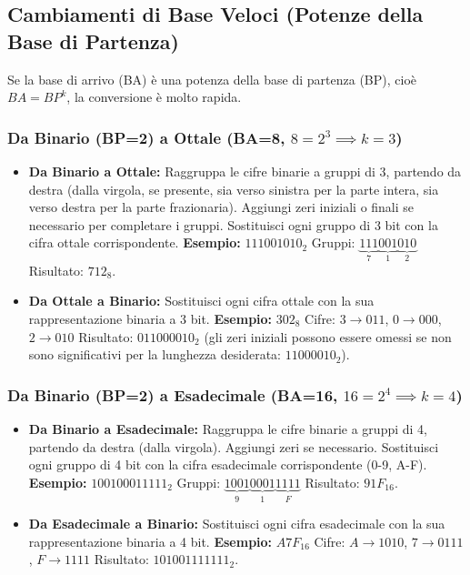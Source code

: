 \subsection{Cambiamenti di Base Veloci (Potenze della Base di Partenza)}
Se la base di arrivo (BA) è una potenza della base di partenza (BP), cioè $BA = BP^k$, la conversione è molto rapida.

\subsubsection{Da Binario (BP=2) a Ottale (BA=8, $8=2^3 \implies k=3$)}
\begin{itemize}
    \item \textbf{Da Binario a Ottale:} Raggruppa le cifre binarie a gruppi di 3, partendo da destra (dalla virgola, se presente, sia verso sinistra per la parte intera, sia verso destra per la parte frazionaria). Aggiungi zeri iniziali o finali se necessario per completare i gruppi. Sostituisci ogni gruppo di 3 bit con la cifra ottale corrispondente.
    \textbf{Esempio:} $111001010_2$
    Gruppi: $\underbrace{111}_{7} \underbrace{001}_{1} \underbrace{010}_{2}$
    Risultato: $712_8$.

    \item \textbf{Da Ottale a Binario:} Sostituisci ogni cifra ottale con la sua rappresentazione binaria a 3 bit.
    \textbf{Esempio:} $302_8$
    Cifre: $3 \rightarrow 011$, $0 \rightarrow 000$, $2 \rightarrow 010$
    Risultato: $011000010_2$ (gli zeri iniziali possono essere omessi se non sono significativi per la lunghezza desiderata: $11000010_2$).
\end{itemize}

\subsubsection{Da Binario (BP=2) a Esadecimale (BA=16, $16=2^4 \implies k=4$)}
\begin{itemize}
    \item \textbf{Da Binario a Esadecimale:} Raggruppa le cifre binarie a gruppi di 4, partendo da destra (dalla virgola). Aggiungi zeri se necessario. Sostituisci ogni gruppo di 4 bit con la cifra esadecimale corrispondente (0-9, A-F).
    \textbf{Esempio:} $100100011111_2$
    Gruppi: $\underbrace{1001}_{9} \underbrace{0001}_{1} \underbrace{1111}_{F}$
    Risultato: $91F_{16}$.

    \item \textbf{Da Esadecimale a Binario:} Sostituisci ogni cifra esadecimale con la sua rappresentazione binaria a 4 bit.
    \textbf{Esempio:} $A7F_{16}$
    Cifre: $A \rightarrow 1010$, $7 \rightarrow 0111$, $F \rightarrow 1111$
    Risultato: $101001111111_2$.
\end{itemize}

